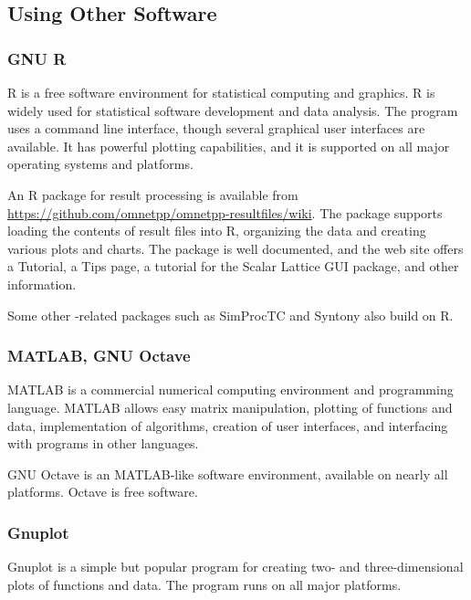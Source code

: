 \subsection{Using Other Software}
\label{sec:ana-sim:alternative-tools}

\subsubsection{GNU R}
\label{sec:ana-sim:gnu-r}

R is a free software environment for statistical computing and graphics.
R is widely used for statistical software development and data analysis.
The program uses a command line interface, though several graphical user
interfaces are available. It has powerful plotting capabilities,
and it is supported on all major operating systems and platforms.

\begin{hint}
An R package for {\opp} result processing is available from
\url{https://github.com/omnetpp/omnetpp-resultfiles/wiki}.
The package supports loading the contents of {\opp} result files into R,
organizing the data and creating various plots and charts.
The package is well documented, and the web site offers a Tutorial, a Tips
page, a tutorial for the Scalar Lattice GUI package, and other information.
\end{hint}

Some other {\opp}-related packages such as SimProcTC and Syntony also build
on R.

\subsubsection{MATLAB, GNU Octave}
\label{sec:ana-sim:matlab-or-octave}

MATLAB is a commercial numerical computing environment and programming language.
MATLAB allows easy matrix manipulation, plotting of functions and data,
implementation of algorithms, creation of user interfaces, and interfacing
with programs in other languages.

GNU Octave is an MATLAB-like software environment, available on nearly all
platforms. Octave is free software.

\subsubsection{Gnuplot}
\label{sec:ana-sim:gnuplot}

Gnuplot is a simple but popular program for creating two- and three-dimensional
plots of functions and data. The program runs on all major platforms.

